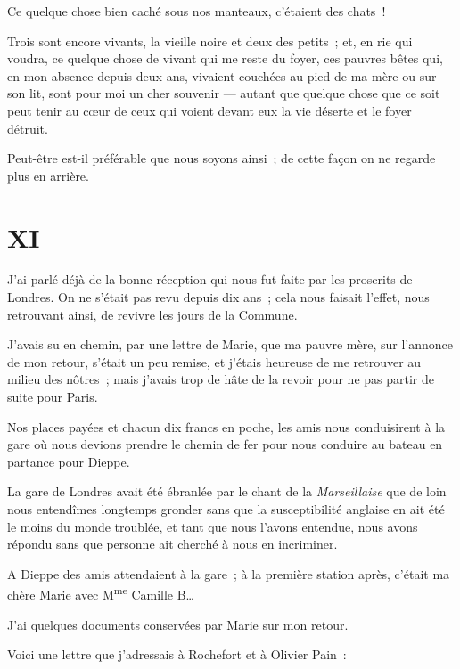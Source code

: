 \documentclass[french,twoside]{book} %
\newcommand\chapteropen{} %
\newcommand\chaptercont{} %
\newcommand\chapterclose{} %
\begin{document}
 Ce quelque chose bien caché sous nos manteaux, c’étaient des chats !\par
Trois sont encore vivants, la vieille noire et deux des petits ; et, en rie qui voudra, ce quelque chose de vivant qui me reste du foyer, ces pauvres bêtes qui, en mon absence depuis deux ans, vivaient couchées au pied de ma mère ou sur son lit, sont pour moi un cher souvenir — autant que quelque chose que ce soit peut tenir au cœur de ceux qui voient devant eux la vie déserte et le foyer détruit.\par
Peut-être est-il préférable que nous soyons ainsi ; de cette façon on ne regarde plus en arrière.
\chapterclose


\chapteropen
 \chapter[{XI}]{XI}
\label{p2.11}

\chaptercont
\noindent J’ai parlé déjà de la bonne réception qui nous fut faite par les proscrits de Londres. On ne s’était pas revu depuis dix ans ; cela nous faisait l’effet, nous retrouvant ainsi, de revivre les jours de la Commune.\par
J’avais su en chemin, par une lettre de Marie, que ma pauvre mère, sur l’annonce de mon retour, s’était un peu remise, et j’étais heureuse de me retrouver au milieu des nôtres ; mais j’avais trop de hâte de la revoir pour ne pas partir de suite pour Paris.\par
Nos places payées et chacun dix francs en poche, les amis nous conduisirent à la gare où nous devions prendre le chemin de fer pour nous conduire au bateau en partance pour Dieppe.\par
La gare de Londres avait été ébranlée par le chant de la \emph{Marseillaise} que de loin nous entendîmes longtemps gronder sans que la susceptibilité anglaise en ait été le moins du monde  troublée, et tant que nous l’avons entendue, nous avons répondu sans que personne ait cherché à nous en incriminer.\par
A Dieppe des amis attendaient à la gare ; à la première station après, c’était ma chère Marie avec M\textsuperscript{me} Camille B…\par
J’ai quelques documents conservées par Marie sur mon retour.\par
Voici une lettre que j’adressais à Rochefort et à Olivier Pain :\par
\end{document}
